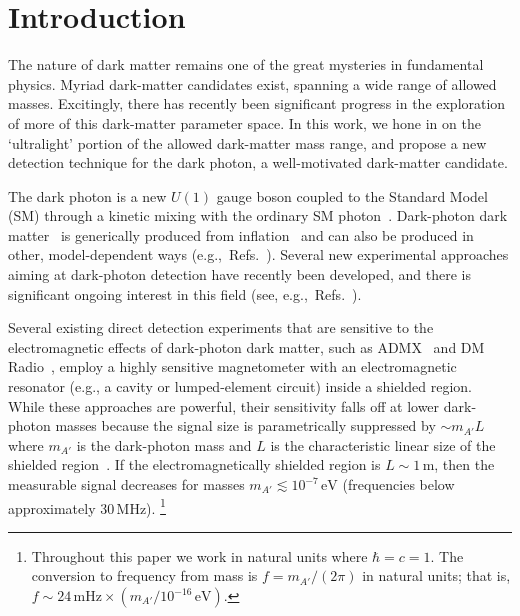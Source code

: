 \documentclass[amsmath,amssymb,aps,10pt,prd,letterpaper,nofootinbib,balancelastpage,notitlepage,superscriptaddress,twocolumn,floatfix]{revtex4-2}
\newcommand{\citeR}[2][]{Ref{#1}.~\cite{#2}}		%
\begin{document}
\section{Introduction}
\label{sec:introduction}

The nature of dark matter remains one of the great mysteries in fundamental physics.
Myriad dark-matter candidates exist, spanning a wide range of allowed masses.
Excitingly, there has recently been significant progress in the exploration of more of this dark-matter parameter space.
In this work, we hone in on the `ultralight' portion of the allowed dark-matter mass range, and propose a new detection technique for the dark photon, a well-motivated dark-matter candidate.

The dark photon is a new $U(1)$ gauge boson coupled to the Standard Model (SM) through a kinetic mixing with the ordinary SM photon~\cite{Holdom:1985ag}.
Dark-photon dark matter~\cite{Nelson:2011sf} is generically produced from inflation~\cite{Graham:2015rva,Ahmed:2020fhc,Kolb:2020fwh} and can also be produced in other, model-dependent ways (e.g.,~\citeR[s]{Arias:2012az,Agrawal:2018vin,dror2019parametric,bastero2019vector,ema2019production,co2019dark,long2019dark,Nakai:2020cfw,nakayama2020gravitational,Salehian:2020asa,Bastero-Gil:2021wsf,co2021gravitational}).
Several new experimental approaches aiming at dark-photon detection have recently been developed, and there is significant ongoing interest in this field (see, e.g.,~\citeR[s]{Wagner:2010mi, Redondo:2010dp, Bahre:2013ywa, Graham:2014sha, Chaudhuri:2014dla, Phipps:2019cqy, TheMADMAXWorkingGroup:2016hpc, Baryakhtar:2018doz, Lawson:2019brd, Gelmini:2020kcu, Jaeckel:2013sqa,Horns:2012jf,Suzuki:2015sza,Andrianavalomahefa:2020ucg,Cantatore:2020obc,Su:2021jvk}).

Several existing direct detection experiments that are sensitive to the electromagnetic effects of dark-photon dark matter, such as ADMX~\cite{Wagner:2010mi} and DM Radio~\cite{Chaudhuri:2014dla}, employ a highly sensitive magnetometer with an electromagnetic resonator (e.g., a cavity or lumped-element circuit) inside a shielded region.
While these approaches are powerful, their sensitivity falls off at lower dark-photon masses because the signal size is parametrically suppressed by $\sim m_{A'} L$ where $m_{A'}$ is the dark-photon mass and $L$ is the characteristic linear size of the shielded region~\cite{Chaudhuri:2014dla}.
If the electromagnetically shielded region is $L \sim 1 \, \text{m}$, then the measurable signal decreases for masses $m_{A'} \lesssim 10^{-7} \, \text{eV}$ (frequencies below approximately 30\,MHz).%
\footnote{\label{ftnt:hbarc1}%
    Throughout this paper we work in natural units where $\hbar = c = 1$.
    The conversion to frequency from mass is $f = m_{A'}/(2\pi)$ in natural units; that is, $f \sim 24 \,\text{mHz} \times ( m_{A'} / 10^{-16}\,\text{eV})$.
} %
\end{document}
